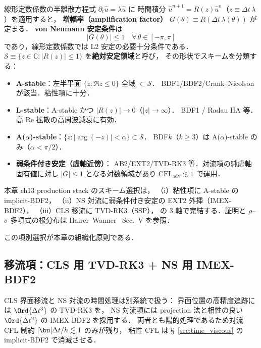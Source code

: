 線形定数係数の半離散方程式 $\partial_t \hat{u} = \lambda \hat{u}$ に
時間積分 $\hat{u}^{n+1} = R(z)\hat{u}^n$（$z\equiv\Delta t\,\lambda$）を適用すると，
\textbf{増幅率（amplification factor）} $G(\theta) \equiv R(\Delta t\,\lambda(\theta))$ が定まる．
\textbf{von Neumann 安定条件}は
\begin{equation}
  |G(\theta)| \le 1 \quad \forall\,\theta\in[-\pi,\pi]
  \label{eq:von_neumann_stability}
\end{equation}
であり，線形定数係数では L2 安定の必要十分条件である．
$\mathcal{S}\equiv\{z\in\mathbb{C}:|R(z)|\le 1\}$ を\textbf{絶対安定領域}と呼び，
その形状でスキームを分類する：
\begin{itemize}[leftmargin=2em]
  \item \textbf{A-stable}：左半平面 $\{z:\Re z\le 0\}$ 全域 $\subset\mathcal{S}$．
        BDF1/BDF2/Crank--Nicolson が該当．粘性項に十分．
  \item \textbf{L-stable}：A-stable かつ $|R(z)|\to 0$（$|z|\to\infty$）．
        BDF1 / Radau IIA 等．高 Re 拡散の高周波減衰に有効．
  \item \textbf{A($\alpha$)-stable}：$\{z:|\arg(-z)|<\alpha\}\subset\mathcal{S}$．
        BDF$k$（$k\ge 3$）は A($\alpha$)-stable のみ（$\alpha<\pi/2$）．
  \item \textbf{弱条件付き安定（虚軸近傍）}：
        AB2/EXT2/TVD-RK3 等．対流項の純虚軸固有値に対し
        $|G|\le 1$ となる対数領域があり $\mathrm{CFL}_{\mathrm{adv}}\lesssim 1$ で運用．
\end{itemize}
本章 ch13 production stack のスキーム選択は，
（i）粘性項に A-stable の implicit-BDF2，
（ii）NS 対流に弱条件付き安定の EXT2 外挿（IMEX-BDF2），
（iii）CLS 移流に TVD-RK3（SSP），
の 3 軸で完結する．証明と $\rho$--$\sigma$ 多項式の根分布は
Hairer--Wanner~\cite{HairerWanner1996} Sec.~V を参照．

この項別選択が本章の組織化原則である．

\subsection{移流項：CLS 用 TVD-RK3 + NS 用 IMEX-BDF2}
\label{sec:time_level1}%

CLS 界面移流と NS 対流の時間処理は別系統で扱う：
界面位置の高精度追跡には $\Ord{\Delta t^3}$ の TVD-RK3 を，
NS 対流項には projection 法と相性の良い $\Ord{\Delta t^2}$ の IMEX-BDF2 を採用する．
両者とも陽的処理であるため対流 CFL 制約 $|\bu|\Delta t/h \lesssim 1$ のみが残り，
粘性 CFL は §~\ref{sec:time_viscous} の implicit-BDF2 で消滅させる．

